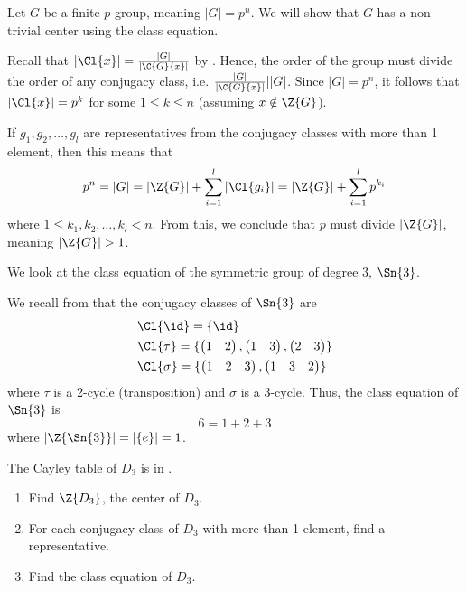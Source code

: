 \begin{example}\label{example-group-with-prime-power-order-has-non-trivial-center}
    Let $G$ be a finite $p$-group, meaning $|G| = p^n$. We will show that $G$ has a non-trivial center using the class equation.

    Recall that $|\Cl{x}| = \frac{|G|}{|\C{G}{x}|}$ by . Hence, the order of the group must divide the order of any conjugacy class, i.e. $\frac{|G|}{|\C{G}{x}|} \vert |G|$. Since $|G| = p^n$, it follows that $|\Cl{x}| = p^k$ for some $1 \leq k \leq n$ (assuming $x \notin \Z{G}$).

    If $g_1, g_2, \dots, g_l$ are representatives from the conjugacy classes with more than 1 element, then this means that
    \[
        p^n = |G| = |\Z{G}| + \sum_{i=1}^l |\Cl{g_i}| = |\Z{G}| + \sum_{i=1}^l p^{k_i}
    \]
    where $1 \leq k_1, k_2, \dots, k_l < n$. From this, we conclude that $p$ must divide $|\Z{G}|$, meaning $|\Z{G}| > 1$.
\end{example}
\begin{example}
    We look at the class equation of the symmetric group of degree 3, $\Sn{3}$.

    We recall from  that the conjugacy classes of $\Sn{3}$ are
    \begin{align*}
        &\Cl{\id} = \{\id\}\\
        &\Cl{\tau} = \{\begin{pmatrix}1 & 2\end{pmatrix}, \begin{pmatrix}1 & 3\end{pmatrix}, \begin{pmatrix}2 & 3\end{pmatrix}\}\\
        &\Cl{\sigma} = \{\begin{pmatrix}1 & 2 & 3\end{pmatrix}, \begin{pmatrix}1 & 3 & 2\end{pmatrix}\}
    \end{align*}
    where $\tau$ is a 2-cycle (transposition) and $\sigma$ is a 3-cycle. Thus, the class equation of $\Sn{3}$ is
    \[
        6 = 1 + 2 + 3
    \]
    where $|\Z{\Sn{3}}| = |\{e\}| = 1$.
\end{example}

\begin{exercise}
    The Cayley table of $D_3$ is in .
    \begin{enumerate}[label=(\alph*)]
        \item Find $\Z{D_3}$, the center of $D_3$.
        \item For each conjugacy class of $D_3$ with more than 1 element, find a representative.
        \item Find the class equation of $D_3$.
    \end{enumerate}
\end{exercise}

